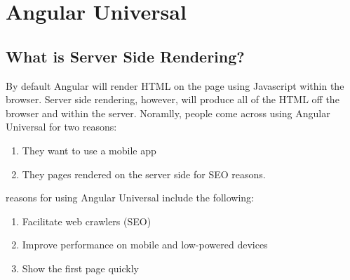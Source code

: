 \chapter{ Angular Universal }


\section{What is Server Side Rendering?}
\begin{quote}
\end{quote}

By default Angular will render HTML on the page using Javascript within the browser. Server side rendering, however, will produce all of the HTML off the browser and within the server. Noramlly, people come across using Angular Universal for two reasons: 
\begin{enumerate}
  \item They want to use a mobile app
  \item They pages rendered on the server side for SEO reasons. 
\end{enumerate}



reasons for using Angular Universal include the following:
\begin{enumerate}
  \item Facilitate web crawlers (SEO)
  \item Improve performance on mobile and low-powered devices
  \item Show the first page quickly
\end{enumerate}
